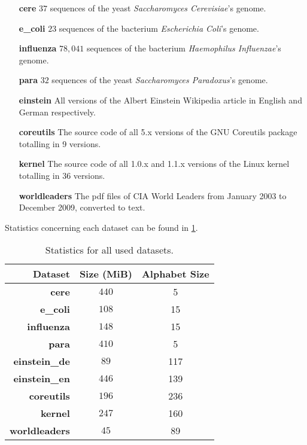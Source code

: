 \documentclass{scrartcl}
\begin{document}
\begin{itemize}[leftmargin=2cm]
	\item[\textbf{cere}] $37$ sequences of the yeast \emph{Saccharomyces Cerevisiae}'s genome.
	\item[\textbf{e\_coli}] $23$ sequences of the bacterium \emph{Escherichia Coli}'s genome.
	\item[\textbf{influenza}] $78,041$ sequences of the bacterium \emph{Haemophilus Influenzae}'s genome.
	\item[\textbf{para}] $32$ sequences of the yeast \emph{Saccharomyces Paradoxus}'s genome.
	\item[\textbf{einstein}] All versions of the Albert Einstein Wikipedia article in English and German respectively.
	\item[\textbf{coreutils}] The source code of all 5.x versions of the GNU Coreutils package totalling in 9 versions.
	\item[\textbf{kernel}] The source code of all 1.0.x and 1.1.x versions of the Linux kernel totalling in 36 versions.
	\item[\textbf{worldleaders}] The pdf files of CIA World Leaders from January 2003 to December 2009, converted to text.
\end{itemize}

Statistics concerning each dataset can be found in \cref{tab:03:datastats}.

\begin{table}
	\caption{Statistics for all used datasets.}
	\label{tab:03:datastats}
	\centering
	\begin{tabular}[c]{r|c|c}
		\textbf{Dataset}      & \textbf{Size (MiB)} & \textbf{Alphabet Size} \\\hline\hline
		\textbf{cere}         & $440$               & 5                      \\
		\textbf{e\_coli}      & $108$               & 15                     \\
		\textbf{influenza}    & $148$               & 15                     \\
		\textbf{para}         & $410$               & 5                      \\
		\textbf{einstein\_de} & $89$                & 117                    \\
		\textbf{einstein\_en} & $446$               & 139                    \\
		\textbf{coreutils}    & $196$               & 236                    \\
		\textbf{kernel}       & $247$               & 160                    \\
		\textbf{worldleaders} & $45$                & 89                     \\
	\end{tabular}
\end{table}
\end{document}
